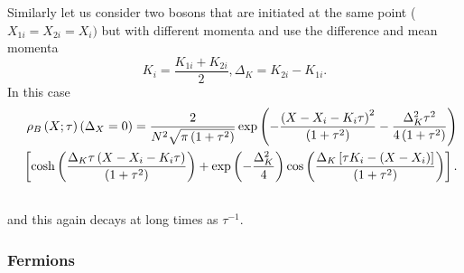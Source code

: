 \documentclass[preprint,aps]{revtex4}
\begin{document}
Similarly let us consider two bosons that are initiated at the same point ($%
X_{1i}=X_{2i}=X_{i})$ but with different momenta and use the difference and
mean momenta%
\begin{equation}
K_{i}=\frac{K_{1i}+K_{2i}}{2},\Delta _{K}=K_{2i}-K_{1i} . \label{2.21}
\end{equation}%
In this case
\begin{eqnarray}
&&\rho _{B}\left( X;\tau \right) \left( \Delta _{X}=0\right) =\frac{2}{N^{2}%
\sqrt{\pi \left( 1+\tau ^{2}\right) }}\exp \left( -\frac{\left(
X-X_{i}-K_{i}\tau \right) ^{2}}{\left( 1+\tau ^{2}\right) }-\frac{\Delta
_{K}^{2}\tau ^{2}}{4\left( 1+\tau ^{2}\right) }\right)  \notag \\
&&\left[ \cosh \left( \frac{\Delta _{K}\tau \left( X-X_{i}-K_{i}\tau \right)
}{\left( 1+\tau ^{2}\right) }\right) +\exp \left( -\frac{\Delta _{K}^{2}}{4}%
\right) \cos \left( \frac{\Delta _{K}\left[ \tau K_{i}-\left( X-X_{i}\right) %
\right] }{\left( 1+\tau ^{2}\right) }\right) \right] .  \notag \\
&&  \label{2.23}
\end{eqnarray}%
and this again decays at long times as $\tau ^{-1}$.

\subsubsection{Fermions}
\end{document}
